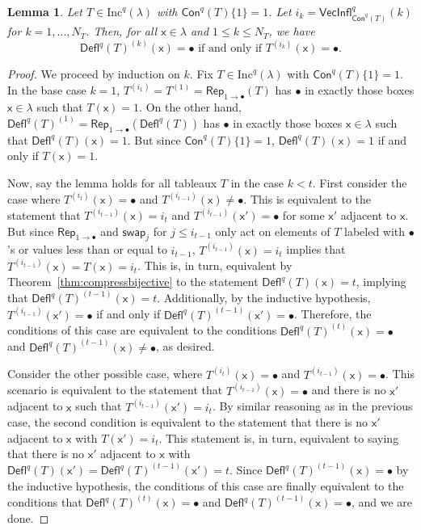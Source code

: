 \documentclass[12pt]{amsart}
\newcommand{\x}{\ensuremath{\mathsf{x}}}
\newtheorem{lemma}[theorem]{Lemma}
\theoremstyle{definition}
\theoremstyle{remark}
\numberwithin{equation}{section}
\newcommand{\inc}{\ensuremath{\mathrm{Inc}}}
\newcommand{\swap}{\ensuremath{\mathsf{swap}}}
\newcommand{\rep}{\ensuremath{\mathsf{Rep}}}
\newcommand{\deflate}{\ensuremath{\mathsf{Defl}}}
\newcommand{\inflate}{\ensuremath{\mathsf{VecInfl}}}
\newcommand{\content}{\ensuremath{\mathsf{Con}}}
\begin{document}
\begin{lemma} \label{lem:bullet_placement}
Let $T \in \inc^q(\lambda)$ with $\content^q(T) \lbrace 1 \rbrace = 1$. Let $i_k = \inflate^q_{\content^q(T)}(k)$ for $k = 1,...,N_T$. Then, for all $\x \in \lambda$ and $1 \leq k \leq N_T$, we have
 \begin{equation}\label{eq:gappy_promotion2}
\deflate^q(T)^{(k)}(\x) = \bullet \text{ if and only if } T^{(i_k)}(\x) = \bullet.
\end{equation}
\end{lemma}
\begin{proof} We proceed by induction on $k$. Fix $T \in \inc^q(\lambda)$  with $\content^q(T) \lbrace 1 \rbrace = 1$. In the base case $k = 1$,  $T^{(i_1)} = T^{(1)} = \rep_{1 \rightarrow \bullet}(T)$ has $\bullet$ in exactly those boxes $\x \in \lambda$ such that $T(\x) = 1$. On the other hand, $\deflate^q(T)^{(1)} =  \rep_{1 \rightarrow \bullet}(\deflate^q(T))$ has $\bullet$ in exactly those boxes $\x \in \lambda$ such that $\deflate^q(T)(\x) = 1$. But since $\content^q(T) \lbrace 1 \rbrace = 1$, $\deflate^q(T)(\x) = 1$ if and only if $T(\x) = 1$. 


Now, say the lemma holds for all tableaux $T$ in the case $k < t$. First consider the case where $T^{(i_t)}(\x) = \bullet$ and $T^{(i_{t-1})}(\x) \neq \bullet$. This is equivalent to the statement that $T^{(i_{t-1})}(\x) = i_t$ and $T^{(i_{t-1})}(\x') = \bullet$ for some $\x'$ adjacent to $\x$. But since $\rep_{1 \rightarrow \bullet}$ and $\swap_j$ for  $j \leq i_{t-1}$ only act on elements of $T$ labeled with $\bullet$'s or values less than or equal to $i_{t-1}$, $T^{(i_{t-1})}(\x) = i_t$ implies that $T^{(i_{t-1})}(\x) = T(\x) = i_t$. This is, in turn, equivalent by Theorem~\ref{thm:compressbijective} to the statement $\deflate^q(T)(\x) = t$, implying that $\deflate^q(T)^{(t-1)}(\x) = t$. Additionally, by the inductive hypothesis, $T^{(i_{t-1})}(\x') = \bullet$ if and only if $\deflate^q(T)^{(t-1)}(\x') = \bullet$. Therefore, the conditions of this case are equivalent to the conditions $\deflate^q(T)^{(t)}(\x) = \bullet$ and $\deflate^q(T)^{(t-1)}(\x) \neq \bullet$, as desired. 

Consider the other possible case, where $T^{(i_t)}(\x) = \bullet$ and $T^{(i_{t-1})}(\x) = \bullet$. This scenario is equivalent to the statement that $T^{(i_{t-1})}(\x) = \bullet$ and there is no $\x'$ adjacent to $\x$ such that $T^{(i_{t-1})}(\x') = i_t$. By similar reasoning as in the previous case, the second condition is equivalent to the statement that there is no $\x'$ adjacent to $\x$ with $T(\x') = i_t$. This statement is, in turn, equivalent to saying that there is no $\x'$ adjacent to $\x$ with $\deflate^q(T)(\x') = \deflate^q(T)^{(t-1)}(\x') = t$. Since $\deflate^q(T)^{(t-1)}(\x) = \bullet$ by the inductive hypothesis, the conditions of this case are finally equivalent to the conditions that $\deflate^q(T)^{(t)}(\x) = \bullet$ and $\deflate^q(T)^{(t-1)}(\x) = \bullet$, and we are done.
\end{proof}
\end{document}
